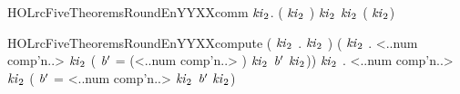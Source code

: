 \newcommand{\HOLrcFiveTheoremsRoundEeYYXXDeYY}{\UseVerbatim{HOLrcFiveTheoremsRoundEeYYXXDeYY}}
\begin{SaveVerbatim}{HOLrcFiveTheoremsRoundEnYYXXcomm}
\HOLTokenTurnstile{} \HOLSymConst{\HOLTokenForall{}}    \ensuremath{\HOLBoundVar{ki}\sb{\mathrm{2}}}.
      (   \ensuremath{\HOLBoundVar{ki}\sb{\mathrm{2}}} )  \ensuremath{\HOLBoundVar{ki}\sb{\mathrm{2}}} \HOLSymConst{=}
        \ensuremath{\HOLBoundVar{ki}\sb{\mathrm{2}}} (   \ensuremath{\HOLBoundVar{ki}\sb{\mathrm{2}}})
\end{SaveVerbatim}
\newcommand{\HOLrcFiveTheoremsRoundEnYYXXcomm}{\UseVerbatim{HOLrcFiveTheoremsRoundEnYYXXcomm}}
\begin{SaveVerbatim}{HOLrcFiveTheoremsRoundEnYYXXcompute}
\HOLTokenTurnstile{} (\HOLSymConst{\HOLTokenForall{}} \ensuremath{\HOLBoundVar{ki}\sb{\mathrm{2}}} .    \ensuremath{\HOLBoundVar{ki}\sb{\mathrm{2}}}  \HOLSymConst{=} ) \HOLSymConst{\HOLTokenConj{}}
   (\HOLSymConst{\HOLTokenForall{}}  \ensuremath{\HOLBoundVar{ki}\sb{\mathrm{2}}} .
       <..num comp'n..>  \ensuremath{\HOLBoundVar{ki}\sb{\mathrm{2}}}  \HOLSymConst{=}
      (
         \ensuremath{\HOLBoundVar{b}\sp{\prime{}}} =  (<..num comp'n..> \HOLSymConst{\ensuremath{-}} )  \ensuremath{\HOLBoundVar{ki}\sb{\mathrm{2}}} 
          \ensuremath{\HOLBoundVar{b}\sp{\prime{}}}  \ensuremath{\HOLBoundVar{ki}\sb{\mathrm{2}}})) \HOLSymConst{\HOLTokenConj{}}
   \HOLSymConst{\HOLTokenForall{}}  \ensuremath{\HOLBoundVar{ki}\sb{\mathrm{2}}} .
      <..num comp'n..>  \ensuremath{\HOLBoundVar{ki}\sb{\mathrm{2}}}  \HOLSymConst{=}
     (
        \ensuremath{\HOLBoundVar{b}\sp{\prime{}}} =  <..num comp'n..>  \ensuremath{\HOLBoundVar{ki}\sb{\mathrm{2}}} 
         \ensuremath{\HOLBoundVar{b}\sp{\prime{}}}  \ensuremath{\HOLBoundVar{ki}\sb{\mathrm{2}}})
\end{SaveVerbatim}
